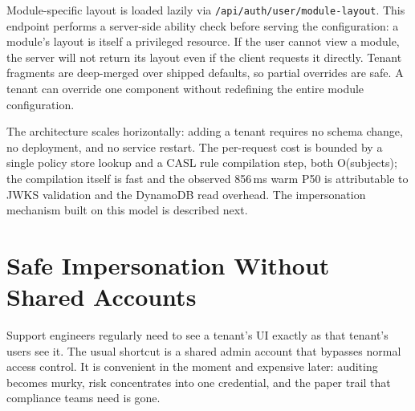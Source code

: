 \documentclass[10pt,journal]{IEEEtran}
\newcommand{\code}[1]{{\small\textcolor{CausifyBlue}{\texttt{#1}}}}
\begin{document}
Module-specific layout is loaded lazily via \code{/api/auth/user/module-layout}.
This endpoint performs a server-side ability check before serving the
configuration: a module's layout is itself a privileged resource. If the
user cannot view a module, the server will not return its layout even if
the client requests it directly. Tenant fragments are deep-merged over
shipped defaults, so partial overrides are safe. A tenant can override one component without redefining the entire module
configuration.

The architecture scales horizontally: adding a tenant requires no schema
change, no deployment, and no service restart. The per-request cost is
bounded by a single policy store lookup and a CASL rule compilation step,
both O(subjects); the compilation itself is fast and the observed 856\,ms
warm P50 is attributable to JWKS validation and the DynamoDB read overhead. The impersonation mechanism built on this model is
described next.

\section{Safe Impersonation Without Shared Accounts}\label{sec:impersonation}

Support engineers regularly need to see a tenant's UI exactly as that
tenant's users see it. The usual shortcut is a shared admin account that
bypasses normal access control. It is convenient in the moment and expensive
later: auditing becomes murky, risk concentrates into one credential, and the
paper trail that compliance teams need is gone.
\end{document}
